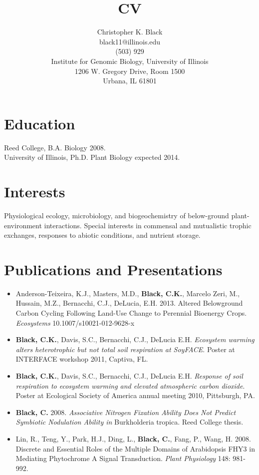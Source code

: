 \documentclass[centered,margin, 11pt]{resume}
\title{CV}
\author{Christopher K. Black\\
black11@illinois.edu\\
(503) 929\textendash 9421\\
Institute for Genomic Biology, University of Illinois\\
1206 W. Gregory Drive, Room 1500\\
Urbana, IL 61801}
\begin{document}
\maketitle

\section{Education}
Reed College, B.A. Biology 2008.\\
University of Illinois, Ph.D. Plant Biology expected 2014. 

\section{Interests}
Physiological ecology, microbiology, and biogeochemistry of below-ground plant-environment interactions. Special interests in commensal and mutualistic trophic exchanges, responses to abiotic conditions, and nutrient storage.

\section{Publications and Presentations}
\begin{itemize}
\item{Anderson-Teixeira, K.J., Masters, M.D.,  {\bf Black, C.K.}, Marcelo Zeri, M., Hussain, M.Z., Bernacchi, C.J., DeLucia, E.H. 2013. Altered Belowground Carbon Cycling Following Land-Use Change to Perennial Bioenergy Crops. \textit{Ecosystems} 10.1007/s10021-012-9628-x}
	\item{{\bf Black, C.K.}, Davis, S.C., Bernacchi, C.J., DeLucia E.H. \textit{Ecosystem warming alters heterotrophic but not total soil respiration at SoyFACE}. Poster at INTERFACE workshop 2011, Captiva, FL.}
	\item{{\bf Black, C.K.}, Davis, S.C., Bernacchi, C.J., DeLucia E.H. \textit{Response of soil respiration to ecosystem warming and elevated atmospheric carbon dioxide}. Poster at Ecological Society of America annual meeting 2010, Pittsburgh, PA.}
	\item{{\bf Black, C.} 2008. \textit{Associative Nitrogen Fixation Ability Does Not Predict Symbiotic Nodulation Ability in} Burkholderia tropica. Reed College thesis.}
	\item{Lin, R., Teng, Y., Park, H.J., Ding, L., {\bf Black, C.}, Fang, P., Wang, H. 2008. Discrete and Essential Roles of the Multiple Domains of Arabidopsis FHY3 in Mediating Phytochrome A Signal Transduction. \textit{Plant Physiology} 148: 981-992.}
\end{itemize}
\end{document}
